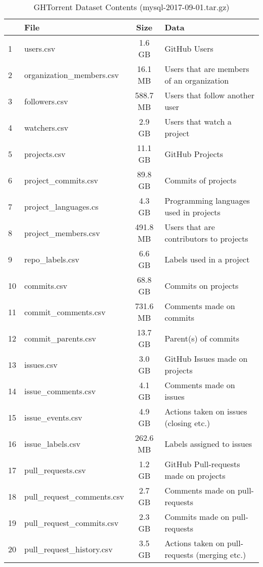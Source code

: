 \begin{table}[htb]
    \centering
    \begin{tabular}{@{}llcl@{}}

        \toprule
             & File & Size & Data \\

        \midrule

            1 & users.csv                   & 1.6 GB   & GitHub Users \\
            2 & organization\_members.csv   & 16.1 MB  & Users that are members of an organization \\
            3 & followers.csv               & 588.7 MB & Users that follow another user \\
            4 & watchers.csv                & 2.9 GB   & Users that watch a project \\
            5 & projects.csv                & 11.1 GB  & GitHub Projects \\
            6 & project\_commits.csv        & 89.8 GB  & Commits of projects \\
            7 & project\_languages.cs       & 4.3 GB   & Programming languages used in projects \\
            8 & project\_members.csv        & 491.8 MB & Users that are contributors to projects \\
            9 & repo\_labels.csv            & 6.6 GB   & Labels used in a project \\
           10 & commits.csv                 & 68.8 GB  & Commits on projects \\
           11 & commit\_comments.csv        & 731.6 MB & Comments made on commits \\
           12 & commit\_parents.csv         & 13.7 GB  & Parent(s) of commits \\
           13 & issues.csv                  & 3.0 GB   & GitHub Issues made on projects \\
           14 & issue\_comments.csv         & 4.1 GB   & Comments made on issues \\
           15 & issue\_events.csv           & 4.9 GB   & Actions taken on issues (closing etc.) \\
           16 & issue\_labels.csv           & 262.6 MB & Labels assigned to issues \\
           17 & pull\_requests.csv          & 1.2 GB   & GitHub Pull-requests made on projects \\
           18 & pull\_request\_comments.csv & 2.7 GB   & Comments made on pull-requests \\
           19 & pull\_request\_commits.csv  & 2.3 GB   & Commits made on pull-requests \\
           20 & pull\_request\_history.csv  & 3.5 GB   & Actions taken on pull-requests (merging etc.) \\

        \bottomrule
    \end{tabular}

    \caption{GHTorrent Dataset Contents (mysql-2017-09-01.tar.gz)}
\end{table}
